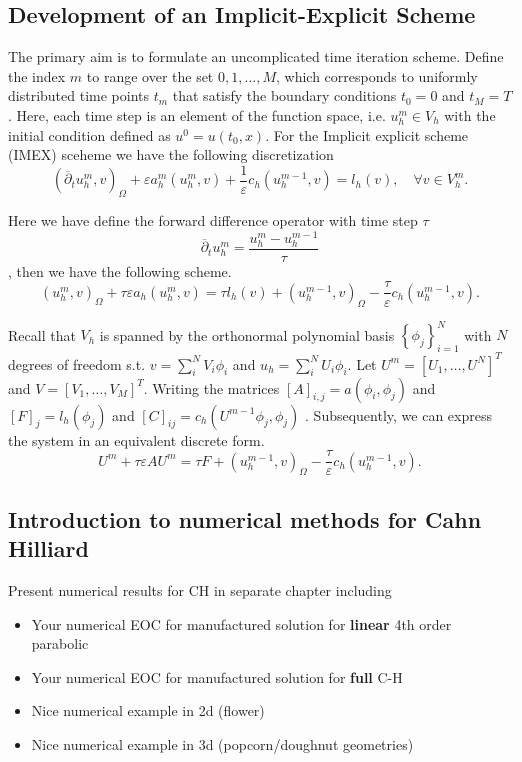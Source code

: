 \subsection{Development of an Implicit-Explicit Scheme}
\label{sub:implicit_explicit_scheme}

The primary aim is to formulate an uncomplicated time iteration scheme. Define the index $m$ to range over the set ${0, 1, \ldots, M}$, which corresponds to uniformly distributed time points $t_{m}$ that satisfy the boundary conditions $t_{0} = 0$
and $t_{M} = T$. Here, each time step is an element of the function space, i.e. $u^{m}_{h} \in V_{h}$  with the initial condition defined as $u^{0} = u( t_{0},x )$.
For the Implicit explicit scheme (IMEX) sceheme we have the following discretization
\[
( \overline{\partial } _{t} u^{m}_{h}, v   )_{\Omega } + \varepsilon a^{m}_{h}( u_{h}^{m} , v) + \frac{1}{\varepsilon } c_{h} (  u_{h}^{m-1}, v)  = l_{h}( v) , \quad \forall v \in V_{h}^{m}.
\]

Here we have define the forward difference operator with time step $\tau $
\[
\overline{\partial } _{t} u_{h}^{m} = \frac{u_{h}^{m} - u_{h}^{m-1}}{ \tau }
\]
, then we have the following scheme.
\[
( u_{h}^{m},v )_{\Omega }  + \tau \varepsilon a_{h}( u_{h}^{m} , v)   = \tau  l_{h}( v) +   ( u_{h}^{m-1},v )_{\Omega } - \frac{\tau}{\varepsilon } c_{h} (  u_{h}^{m-1}, v) .
\]

Recall that $V_{h}$ is spanned by the orthonormal polynomial basis $ \left\{ \phi _{j} \right\}_{i=1}^{ N}  $ with $N$ degrees of freedom  s.t.  $v = \sum_{i}^{N} V_{i} \phi_{i}   $ and $u_{h} = \sum_{i}^{N} U_{i} \phi_{i}   $.
Let  $U^{m} = \left[ U_{1}, \ldots, U^{N} \right]^{T} $ and $V= \left[ V_{1}, \ldots, V_{M} \right]^{T} $. Writing the matrices $[ A ]_{i,j} =  a( \phi _{i}, \phi _{j})  $ and $\left[ F \right] _{j} = l_{h}( \phi _{j})  $ and $ \left[ C \right]_{ij}
= c_{h}( U^{m-1} \phi _{j}, \phi _{j}) $  .
Subsequently, we can express the system in an equivalent discrete form.
\[
U^{m}  + \tau \varepsilon A U^{m}    = \tau  F +   ( u_{h}^{m-1},v )_{\Omega } - \frac{\tau}{\varepsilon } c_{h} (  u_{h}^{m-1}, v).
\]




\subsection{Introduction to numerical methods for Cahn Hilliard}%
\label{sub:introduction_to_numerical_methods_for_cahn_hilliard}

Present numerical results for CH in separate chapter including
\begin{itemize}
    \item Your numerical EOC for  manufactured solution for \textbf{linear} 4th order parabolic
    \item Your numerical EOC for  manufactured solution for \textbf{full} C-H
    \item Nice numerical example in 2d (flower)
    \item Nice numerical example in 3d (popcorn/doughnut geometries)
\end{itemize}


